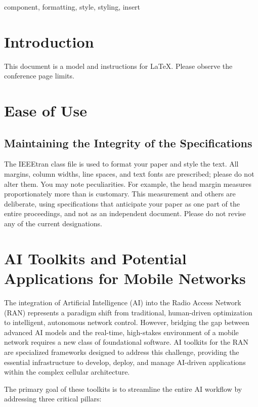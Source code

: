 \documentclass[conference]{IEEEtran}
\begin{document}
\begin{IEEEkeywords}
component, formatting, style, styling, insert
\end{IEEEkeywords}

\section{Introduction}
This document is a model and instructions for \LaTeX.
Please observe the conference page limits. 

\section{Ease of Use}

\subsection{Maintaining the Integrity of the Specifications}

The IEEEtran class file is used to format your paper and style the text. All margins, 
column widths, line spaces, and text fonts are prescribed; please do not 
alter them. You may note peculiarities. For example, the head margin
measures proportionately more than is customary. This measurement 
and others are deliberate, using specifications that anticipate your paper 
as one part of the entire proceedings, and not as an independent document. 
Please do not revise any of the current designations.

\section{AI Toolkits and Potential Applications for Mobile Networks}
The integration of Artificial Intelligence (AI) into the Radio Access Network (RAN) represents a paradigm shift from traditional, human-driven optimization to intelligent, autonomous network control. However, bridging the gap between advanced AI models and the real-time, high-stakes environment of a mobile network requires a new class of foundational software. AI toolkits for the RAN are specialized frameworks designed to address this challenge, providing the essential infrastructure to develop, deploy, and manage AI-driven applications within the complex cellular architecture.

The primary goal of these toolkits is to streamline the entire AI workflow by addressing three critical pillars:
\end{document}
